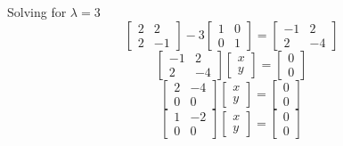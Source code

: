 \documentclass[12pt,a4paper]{paper}
\begin{document}
\begin{enumerate}
\begin{enumerate}
\begin{multicols}{2}
Solving for $\lambda = 3$
\begin{equation}
\left[\begin{array}{cc}
    2 & 2 \\
    2 & -1
\end{array}\right]-3\left[\begin{array}{cc}
    1 & 0 \\
    0 & 1
\end{array}\right] = \left[\begin{array}{cc}
    -1 & 2 \\
    2 & -4
\end{array}\right]
\end{equation}
\begin{equation}
\left[\begin{array}{cc}
    -1 & 2 \\
    2 & -4
\end{array}\right]\left[\begin{array}{c}
    x \\
    y
\end{array}\right] = \left[\begin{array}{c}
    0 \\
    0
\end{array}\right]
\end{equation}
\begin{equation}
\left[\begin{array}{cc}
    2 & -4 \\
    0 & 0
\end{array}\right]\left[\begin{array}{c}
    x \\
    y
\end{array}\right] = \left[\begin{array}{c}
    0 \\
    0
\end{array}\right]
\end{equation}
\begin{equation}
\left[\begin{array}{cc}
    1 & -2 \\
    0 & 0
\end{array}\right]\left[\begin{array}{c}
    x \\
    y
\end{array}\right] = \left[\begin{array}{c}
    0 \\
    0
\end{array}\right]

\end{equation}
\end{multicols}
\end{enumerate}
\end{enumerate}
\end{document}
